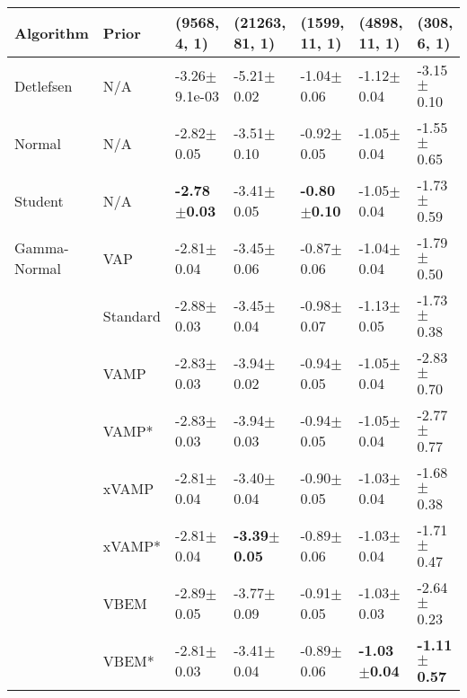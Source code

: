 \begin{tabular}{lllllll}
Algorithm & Prior& (9568, 4, 1)& (21263, 81, 1)& (1599, 11, 1)& (4898, 11, 1)& (308, 6, 1)\\
\midrule
Detlefsen & N/A &        -3.26$\pm$9.1e-03 &           -5.21$\pm$0.02 &           -1.04$\pm$0.06 &           -1.12$\pm$0.04 &           -3.15$\pm$0.10 \\
Normal & N/A &           -2.82$\pm$0.05 &           -3.51$\pm$0.10 &           -0.92$\pm$0.05 &           -1.05$\pm$0.04 &           -1.55$\pm$0.65 \\
Student & N/A &  \textbf{-2.78$\pm$0.03} &           -3.41$\pm$0.05 &  \textbf{-0.80$\pm$0.10} &           -1.05$\pm$0.04 &           -1.73$\pm$0.59 \\
Gamma-Normal & VAP &           -2.81$\pm$0.04 &           -3.45$\pm$0.06 &           -0.87$\pm$0.06 &           -1.04$\pm$0.04 &           -1.79$\pm$0.50 \\
             & Standard &           -2.88$\pm$0.03 &           -3.45$\pm$0.04 &           -0.98$\pm$0.07 &           -1.13$\pm$0.05 &           -1.73$\pm$0.38 \\
             & VAMP &           -2.83$\pm$0.03 &           -3.94$\pm$0.02 &           -0.94$\pm$0.05 &           -1.05$\pm$0.04 &           -2.83$\pm$0.70 \\
             & VAMP* &           -2.83$\pm$0.03 &           -3.94$\pm$0.03 &           -0.94$\pm$0.05 &           -1.05$\pm$0.04 &           -2.77$\pm$0.77 \\
             & xVAMP &           -2.81$\pm$0.04 &           -3.40$\pm$0.04 &           -0.90$\pm$0.05 &           -1.03$\pm$0.04 &           -1.68$\pm$0.38 \\
             & xVAMP* &           -2.81$\pm$0.04 &  \textbf{-3.39$\pm$0.05} &           -0.89$\pm$0.06 &           -1.03$\pm$0.04 &           -1.71$\pm$0.47 \\
             & VBEM &           -2.89$\pm$0.05 &           -3.77$\pm$0.09 &           -0.91$\pm$0.05 &           -1.03$\pm$0.03 &           -2.64$\pm$0.23 \\
             & VBEM* &           -2.81$\pm$0.03 &           -3.41$\pm$0.04 &           -0.89$\pm$0.06 &  \textbf{-1.03$\pm$0.04} &  \textbf{-1.11$\pm$0.57} \\
\bottomrule
\end{tabular}

